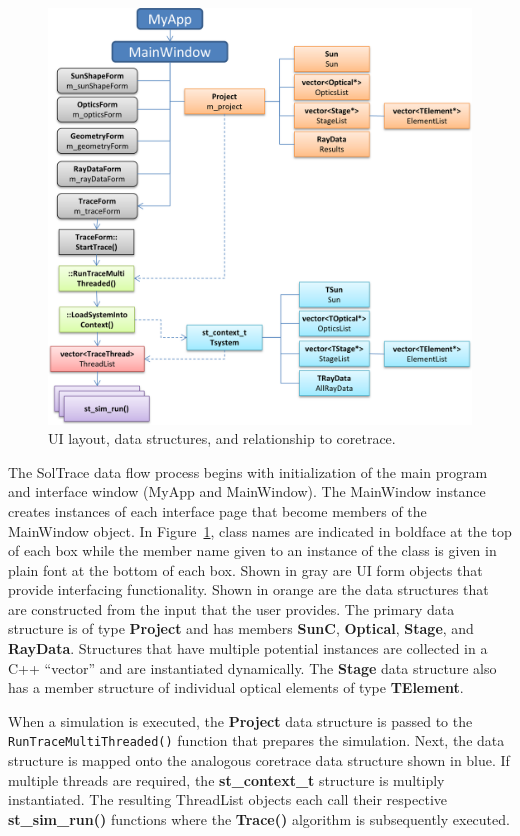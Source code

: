 \documentclass[11pt,letterpaper]{article}
\newcommand{\figref}[1]{Figure~\ref{#1}}
\begin{document}
\begin{figure}[tbp]
\centering
\includegraphics[width=\textwidth]{app-layout}
\caption{UI layout, data structures, and relationship to coretrace.}
\label{fig:app-layout}
\end{figure}

The SolTrace data flow process begins with initialization of the main program and interface window (MyApp and MainWindow). 
The MainWindow instance creates instances of each interface page that become members of the MainWindow object. 
In \figref{fig:app-layout}, class names are indicated in boldface at the top of each box while the member name given to an instance of the class is given in plain font at the bottom of each box. 
Shown in gray are UI form objects that provide interfacing functionality. 
Shown in orange are the data structures that are constructed from the input that the user provides. 
The primary data structure is of type {\bf Project} and has members {\bf SunC}, {\bf Optical}, {\bf Stage}, and {\bf RayData}. 
Structures that have multiple potential instances are collected in a C++ ``vector'' and are instantiated dynamically. 
The {\bf Stage} data structure also has a member structure of individual optical elements of type {\bf TElement}. 

When a simulation is executed, the {\bf Project} data structure is passed to the \texttt{RunTraceMultiThreaded()} function that prepares the simulation. 
Next, the data structure is mapped onto the analogous coretrace data structure shown in blue. 
If multiple threads are required, the {\bf st\_context\_t} structure is multiply instantiated.  
The resulting ThreadList objects each call their respective {\bf st\_sim\_run()} functions where the {\bf Trace()} algorithm is subsequently executed. 
\end{document}
